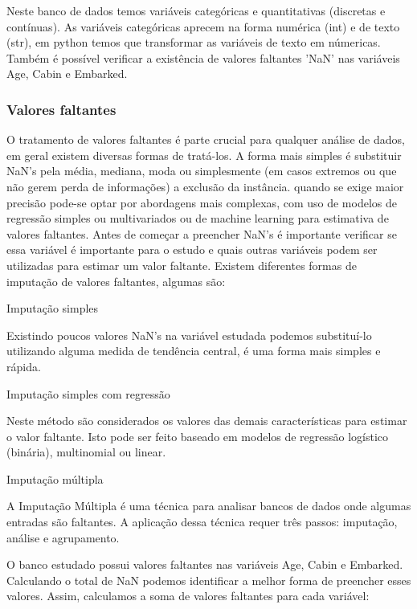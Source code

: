 \documentclass[11pt]{article}
\begin{document}
    Neste banco de dados temos variáveis categóricas e quantitativas
(discretas e contínuas). As variáveis categóricas aprecem na forma
numérica (int) e de texto (str), em python temos que transformar as
variáveis de texto em númericas. Também é possível verificar a
existência de valores faltantes 'NaN' nas variáveis Age, Cabin e
Embarked.

\subsubsection{Valores faltantes}\label{valores-faltantes}

O tratamento de valores faltantes é parte crucial para qualquer análise
de dados, em geral existem diversas formas de tratá-los. A forma mais
simples é substituir NaN's pela média, mediana, moda ou simplesmente (em
casos extremos ou que não gerem perda de informações) a exclusão da
instância. quando se exige maior precisão pode-se optar por abordagens
mais complexas, com uso de modelos de regressão simples ou multivariados
ou de machine learning para estimativa de valores faltantes. Antes de
começar a preencher NaN's é importante verificar se essa variável é
importante para o estudo e quais outras variáveis podem ser utilizadas
para estimar um valor faltante. Existem diferentes formas de imputação
de valores faltantes, algumas são:

Imputação simples

Existindo poucos valores NaN's na variável estudada podemos substituí-lo
utilizando alguma medida de tendência central, é uma forma mais simples
e rápida.

Imputação simples com regressão

Neste método são considerados os valores das demais características para
estimar o valor faltante. Isto pode ser feito baseado em modelos de
regressão logístico (binária), multinomial ou linear.

Imputação múltipla

A Imputação Múltipla é uma técnica para analisar bancos de dados onde
algumas entradas são faltantes. A aplicação dessa técnica requer três
passos: imputação, análise e agrupamento.

O banco estudado possui valores faltantes nas variáveis Age, Cabin e
Embarked. Calculando o total de NaN podemos identificar a melhor forma
de preencher esses valores. Assim, calculamos a soma de valores
faltantes para cada variável:
\end{document}
